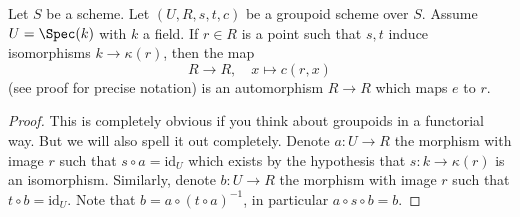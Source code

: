 \begin{lemma}
\label{lemma-groupoid-on-field-move-point}
Let $S$ be a scheme. Let $(U, R, s, t, c)$ be a groupoid scheme
over $S$. Assume $U = \Spec(k)$ with $k$ a field.
If $r \in R$ is a point such that $s, t$ induce
isomorphisms $k \to \kappa(r)$, then the map
$$
R \longrightarrow R, \quad
x \longmapsto c(r, x)
$$
(see proof for precise notation) is an automorphism $R \to R$
which maps $e$ to $r$.
\end{lemma}

\begin{proof}
This is completely obvious if you think about groupoids in a
functorial way. But we will also spell it out completely.
Denote $a : U \to R$ the morphism with image $r$ such that
$s \circ a = \text{id}_U$ which exists by the hypothesis
that $s : k \to \kappa(r)$ is an isomorphism. Similarly, denote
$b : U \to R$ the morphism with image $r$ such that
$t \circ b = \text{id}_U$. Note that
$b = a \circ (t \circ a)^{-1}$, in particular
$a \circ s \circ b = b$.


\end{proof}
